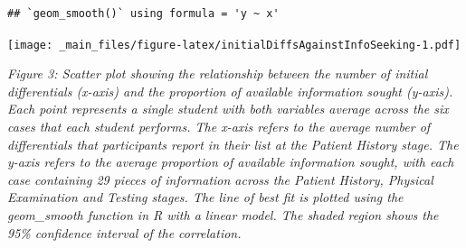 \documentclass[a4paper, nobind]{templates/ociamthesis}
\newenvironment{Shaded}{\begin{snugshade}}{\end{snugshade}}
\newcommand{\AttributeTok}[1]{\textcolor[rgb]{0.13,0.29,0.53}{#1}}
\newcommand{\ConstantTok}[1]{\textcolor[rgb]{0.56,0.35,0.01}{#1}}
\newcommand{\DecValTok}[1]{\textcolor[rgb]{0.00,0.00,0.81}{#1}}
\newcommand{\DocumentationTok}[1]{\textcolor[rgb]{0.56,0.35,0.01}{\textbf{\textit{#1}}}}
\newcommand{\FunctionTok}[1]{\textcolor[rgb]{0.13,0.29,0.53}{\textbf{#1}}}
\newcommand{\NormalTok}[1]{#1}
\newcommand{\OtherTok}[1]{\textcolor[rgb]{0.56,0.35,0.01}{#1}}
\newcommand{\SpecialCharTok}[1]{\textcolor[rgb]{0.81,0.36,0.00}{\textbf{#1}}}
\newcommand{\StringTok}[1]{\textcolor[rgb]{0.31,0.60,0.02}{#1}}
\renewenvironment{Shaded}
{
  \vspace{10pt}%
  \begin{snugshade}%
}{%
  \end{snugshade}%
  \vspace{8pt}%
}
\begin{document}
\begin{Shaded}
\end{Shaded}

\begin{verbatim}
## `geom_smooth()` using formula = 'y ~ x'
\end{verbatim}

\texttt{[image: \_main\_files/figure-latex/initialDiffsAgainstInfoSeeking-1.pdf]}

\emph{Figure 3: Scatter plot showing the relationship between the number of initial differentials (x-axis) and the proportion of available information sought (y-axis). Each point represents a single student with both variables average across the six cases that each student performs. The x-axis refers to the average number of differentials that participants report in their list at the Patient History stage. The y-axis refers to the average proportion of available information sought, with each case containing 29 pieces of information across the Patient History, Physical Examination and Testing stages. The line of best fit is plotted using the geom\_smooth function in R with a linear model. The shaded region shows the 95\% confidence interval of the correlation.}
\end{document}
